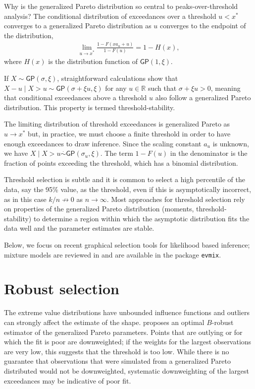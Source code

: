 \documentclass[]{book}
\begin{document}
Why is the generalized Pareto distribution so central to peaks-over-threshold analysis? The conditional distribution of exceedances over a threshold \(u < x^*\) converges to a generalized Pareto distribution as \(u\) converges to the endpoint of the distribution,
\begin{align*}
\lim_{u \to x^*} \frac{1-F(xa_u+u)}{1-F(u)} = 1-H(x),
\end{align*}
where \(H(x)\) is the distribution function of \(\mathsf{GP}(1, \xi)\).

If \(X \sim \mathsf{GP}(\sigma, \xi)\), straightforward calculations show that \(X-u \mid X>u \sim \mathsf{GP}(\sigma + \xi u, \xi)\) for any \(u \in \mathbb{R}\) such that \(\sigma+\xi u>0\), meaning that conditional exceedances above a threshold \(u\) also follow a generalized Pareto distribution. This property is termed threshold-stability.

The limiting distribution of threshold exceedances is generalized Pareto as \(u \to x^*\) but, in practice, we must choose a finite threshold in order to have enough exceedances to draw inference. Since the scaling constant \(a_u\) is unknown, we have \(X \mid X > u \stackrel{\cdot}{\sim} \mathsf{GP}(\sigma_u, \xi)\). The term \(1-F(u)\) in the denominator is the fraction of points exceeding the threshold, which has a binomial distribution.

Threshold selection is subtle and it is common to select a high percentile of the data, say the
95\% value, as the threshold, even if this is asymptotically incorrect, as in this case \(k/n \nrightarrow 0\) as \(n \to \infty\). Most approaches for threshold selection rely on properties of the
generalized Pareto distribution (moments, threshold-stability) to determine a region within which the asymptotic distribution fits the data well and the parameter estimates are stable.

Below, we focus on recent graphical selection tools for likelihood based inference; mixture models are reviewed in \citet{Scarrott:2012} and are available in the package \texttt{evmix}.

\hypertarget{robust-selection}{%
\section{Robust selection}\label{robust-selection}}

The extreme value distributions have unbounded influence functions and outliers can strongly affect the estimate of the shape. \citet{Dupuis:1999} proposes an optimal \(B\)-robust estimator of the generalized Pareto parameters. Points that are outlying or for which the fit is poor are downweighted; if the weights for the largest observations are very low, this suggests that the threshold is too low. While there is no guarantee that observations that were simulated from a generalized Pareto distributed would not be downweighted, systematic downweighting of the largest exceedances may be indicative of poor fit.
\end{document}
